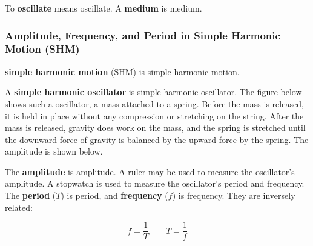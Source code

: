 \documentclass[dvipsnames]{article}
\begin{document}
To \textbf{\gls{oscillate}} means \glsdesc{oscillate}. A \textbf{\gls{medium}} is \glsdesc{medium}. 

\subsubsection{Amplitude, Frequency, and Period in Simple Harmonic Motion (SHM)}

\textbf{\Gls{simple harmonic motion}} (SHM) is \glsdesc{simple harmonic motion}.

A \textbf{\gls{simple harmonic oscillator}} is \glsdesc{simple harmonic oscillator}. The figure below shows such a oscillator, a mass attached to a spring. Before the mass is released, it is held in place without any compression or stretching on the string. After the mass is released, gravity does work on the mass, and the spring is stretched until the downward force of gravity is balanced by the upward force by the spring. The amplitude is shown below.

\begin{center}
\end{center}

The \textbf{\gls{amplitude}} is \glsdesc{amplitude}. A ruler may be used to measure the oscillator's amplitude. A stopwatch is used to measure the oscillator's period and frequency. The \textbf{\gls{period}} ($T$) is \glsdesc{period}, and \textbf{\gls{frequency}} ($f$) is \glsdesc{frequency}. They are inversely related:

\begin{equation} \label{9WT68r}
    f = \frac{1}{T} \hspace{2em} 
    T = \frac{1}{f}
\end{equation}
\end{document}
